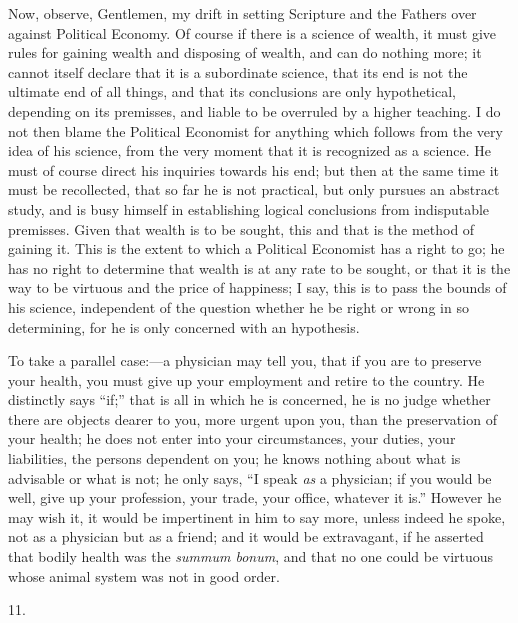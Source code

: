 Now, observe, Gentlemen, my drift in setting Scripture and the
Fathers over against Political Economy. Of course if there is a
science of wealth, it must give rules for gaining wealth and disposing
of wealth, and can do nothing more; it cannot itself declare that it
is a subordinate science, that its end is not the ultimate end of all
things, and that its conclusions are only hypothetical, depending on
its premisses, and liable to be overruled by a higher teaching. I do
not then blame the Political Economist for anything which follows from
the very idea of his science, from the very moment that it is
recognized as a science. He must of course direct his inquiries
towards his end; but then at the same time it must be recollected,
that so far he is not practical, but only pursues an abstract study,
and is busy himself in establishing logical conclusions from
indisputable premisses. Given that wealth is to be sought, this and
that is the method of gaining it. This is the extent to which a
Political Economist has a right to go; he has no right to determine
that wealth is at any rate to be sought, or that it is the way to be
virtuous and the price of happiness; I say, this is to pass the
bounds of his science, independent of the question whether he be right
or wrong in so determining, for he is only concerned with an
hypothesis.

To take a parallel case:—a physician may tell you, that if you
are to preserve your health, you must give up your employment and
retire to the country. He distinctly says ``if;'' that is all
in which he is concerned, he is no judge whether there are objects
dearer to you, more urgent upon you, than the preservation of your
health; he does not enter into your circumstances, your duties, your
liabilities, the persons dependent on you; he knows nothing about what
is advisable or what is not; he only says, ``I speak \emph{as} a
physician; if you would be well, give up your profession, your trade,
your office, whatever it is.'' However he may wish it, it would be
impertinent in him to say more, unless indeed he spoke, not as a
physician but as a friend; and it would be extravagant, if he asserted
that bodily health was the \emph{summum bonum}, and that no one could
be virtuous whose animal system was not in good order.

11.

